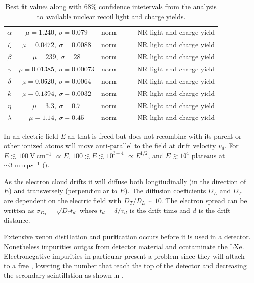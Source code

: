 \begin{table}
{\begin{tabular}{cccccc}
$\alpha$ & $\mu = 1.240,\ \sigma = 0.079$ & norm &  &  & NR light and charge yield \\
$\zeta$ & $\mu = 0.0472,\ \sigma = 0.0088$ & norm &  &  & NR light and charge yield \\
$\beta$ & $\mu = 239,\ \sigma = 28$ & norm &  &  & NR light and charge yield \\
$\gamma$ & $\mu = 0.01385,\ \sigma = 0.00073$ & norm &  &  & NR light and charge yield \\
$\delta$ & $\mu = 0.0620,\ \sigma = 0.0064$ & norm &  &  & NR light and charge yield \\
$k$ & $\mu = 0.1394,\ \sigma = 0.0032$ & norm &  &  & NR light and charge yield \\
$\eta$ & $\mu = 3.3,\ \sigma = 0.7$ & norm &  &  & NR light and charge yield \\
$\lambda$ & $\mu = 1.14,\ \sigma = 0.45$ & norm &  &  & NR light and charge yield \\
\hline
\end{tabular}
}
\caption{Best fit values along with 68\% confidence intetervals from the  analysis to available nuclear recoil light and
charge yields.}
\label{tab:er_nr_calibrations_parameter_determ_mc_match}
\end{table}
\egroup









In an electric field $E$ an \electron that is freed but does not recombine with its parent or other ionized atoms will move anti-parallel
to the field at drift velocity $v_{d}$.  For $E \lesssim 100\ \mathrm{V\ cm^{-1}}$ \vd$\propto E$, $100 \lesssim E \lesssim 10^{3-4}$
\vd$\propto E^{1/2}$, and $E \gtrsim 10^{4}$ \vd plateaus at $\sim 3\ \mathrm{mm\ \mu s^{-1}}$ ().


As the electron cloud drifts it will diffuse both longitudinally (in the direction of $E$) and transversely (perpendicular to $E$).  The
diffusion coefficients $D_{L}$ and $D_{T}$ are dependent on the electric field with $D_{T}/D_{L} \sim 10$.  The electron spread can
be written as $\sigma_{D_{T}} = \sqrt{D_{T} t_{d}}$ where $t_{d} = d/v_{d}$ is the drift time and $d$ is the drift distance.

Extensive xenon distillation and purification occurs before it is used in a detector.  Nonetheless impurities outgas from detector
material and contaminate the LXe.  Electronegative impurities in particular present a problem since they will attach to a free \electron,
lowering the number that reach the top of the detector and decreasing the secondary scintillation as shown in .

